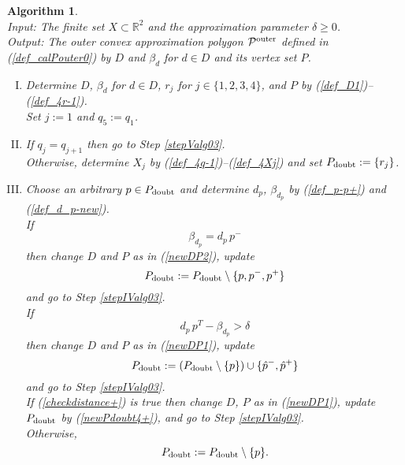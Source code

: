 \documentclass[12pt]{article}
\newtheorem{algorithm}{Algorithm}
\def\R{\mathbb{R}}
\begin{document}
\begin{algorithm}\label{alg03}  \rm \ \\
\emph{Input:} The finite set $X \subset \R^2$ and the approximation parameter $\delta \geq 0$. \\
\emph{Output:} The outer convex approximation polygon ${\cal P}^{\rm outer}$ defined in (\ref{def_calPouter0}) by $D$ and $\beta_d$ for $d \in D$ and its vertex set $P$.
\begin{enumerate}[I.]
\item\label{stepIalg03} 
Determine $D$, $\beta_d$ for $d \in D$, $r_j$ for $j \in \{1, 2, 3, 4\}$, and $P$ by (\ref{def_D1})--(\ref{def_4r-1}). \\
Set $j := 1$ and $q_5 := q_1$. 

\item\label{stepIIalg03} 
If $q_j = q_{j+1}$ then go to Step \ref{stepValg03}.\\
Otherwise, determine $X_j$ by (\ref{def_4q-1})--(\ref{def_4Xj}) and set $P_{\rm doubt} := \{r_j\}$.

\item\label{stepIIIalg03} 
Choose an arbitrary $p \in P_{\rm doubt}$ and determine $d_p$, $\beta_{d_p}$ by (\ref{def_p-p+}) and (\ref{def_d_p-new}). \\
If
\begin{equation*}%
\beta_{d_p} = d_p\, p^-
\end{equation*}
then change $D$ and $P$ as in (\ref{newDP2}), update 
\begin{equation*}\label{newPdoubt5+}
P_{\rm doubt} := P_{\rm doubt} \setminus \{p, p^-, p^+\}
\end{equation*}
and go to Step \ref{stepIValg03}.\\
If 
\begin{equation*}%
d_{p}\, p^T - \beta_{d_{p}} > \delta
\end{equation*}
then change $D$ and $P$ as in (\ref{newDP1}), update 
\begin{equation}\label{newPdoubt4+}
P_{\rm doubt} := (P_{\rm doubt} \setminus \{p\}) \cup \{\hat p^-, \hat p^+\}
\end{equation}
and go to Step \ref{stepIValg03}.\\
If (\ref{checkdistance+}) is true then change $D$, $P$ as in (\ref{newDP1}), update $P_{\rm doubt}$ by (\ref{newPdoubt4+}), and go to Step \ref{stepIValg03}.\\
Otherwise,
\begin{equation*}%
P_{\rm doubt} := P_{\rm doubt} \setminus \{p\}.
\end{equation*}


\end{enumerate}
\end{algorithm}
\end{document}

